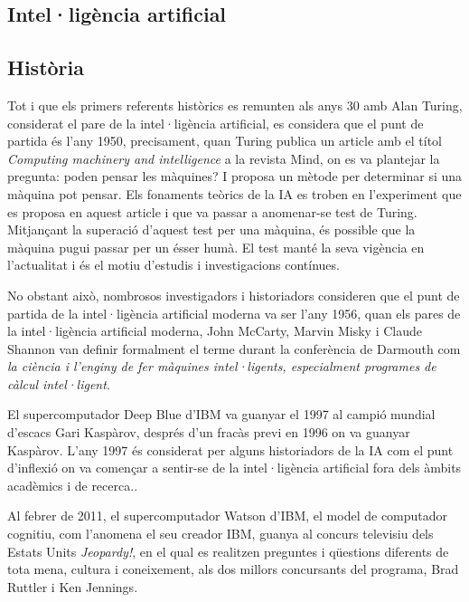 \begin{refsection}

	\chapter{Intel·ligència artificial}
	\label{chap:AI}

	\section{Història}
	
	Tot i que els primers referents històrics es remunten als anys 30 amb Alan Turing, considerat el pare de la intel·ligència artificial, es considera que el punt de partida és l'any 1950, precisament, quan Turing publica un article amb el títol \textit{Computing machinery and intelligence} a la revista Mind, on es va plantejar la pregunta: poden pensar les màquines? I proposa un mètode per determinar si una màquina pot pensar. Els fonaments teòrics de la IA es troben en l'experiment que es proposa en aquest article i que va passar a anomenar-se test de Turing. Mitjançant la superació d'aquest test per una màquina, és possible que la màquina pugui passar per un ésser humà. El test manté la seva vigència en l'actualitat i és el motiu d'estudis i investigacions contínues.\supercite{Breuhist}
	
	No obstant això, nombrosos investigadors i historiadors consideren que el punt de partida de la intel·ligència artificial moderna va ser l'any 1956, quan els pares de la intel·ligència artificial moderna, John McCarty, Marvin Misky i Claude Shannon van definir formalment el terme durant la conferència de Darmouth com \textit{la ciència i l'enginy de fer màquines intel·ligents, especialment programes de càlcul intel·ligent}.\supercite{LiveScience}
	
	El supercomputador Deep Blue d'IBM va guanyar el 1997 al campió mundial d'escacs Gari Kaspàrov, després d'un fracàs previ en 1996 on va guanyar Kaspàrov. L'any 1997 és considerat per alguns historiadors de la IA com el punt d'inflexió on va començar a sentir-se de la intel·ligència artificial fora dels àmbits acadèmics i de recerca.\supercite{Breuhist}.
	
	Al febrer de 2011, el supercomputador Watson d'IBM, el model de computador cognitiu, com l'anomena el seu creador IBM, guanya al concurs televisiu dels Estats Units \textit{Jeopardy!}, en el qual es realitzen preguntes i qüestions diferents de tota mena, cultura i coneixement, als dos millors concursants del programa, Brad Ruttler i Ken Jennings.\supercite{aiwiki}
	

\end{refsection}
